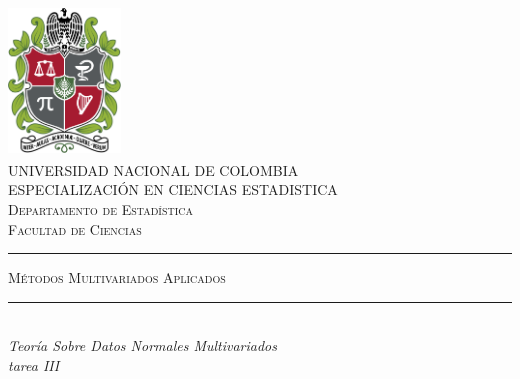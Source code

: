 



\begin{titlepage}

\newcommand{\HRule}{\rule{\linewidth}{0.5mm}} %

\center %


\begin{minipage}{13.5cm}
\center

\includegraphics[width=3cm,height=4cm]{logo}\\[0.5cm] %


\textsc{\Large UNIVERSIDAD NACIONAL DE COLOMBIA \\[1.0cm]
{\large ESPECIALIZACIÓN EN CIENCIAS ESTADISTICA\\[0.5cm]
Departamento de Estadística\\[0.2cm]
Facultad de Ciencias}}\\[2cm]



\rule[1.7mm]{1cm}{0.5mm}
\hfill
\textsc{\Large Métodos Multivariados Aplicados}
\hfill
\rule[1.7mm]{1cm}{0.5mm}
\\[0.2cm]

{\Large
\textit{Teoría Sobre Datos Normales Multivariados\\
tarea III}
}\\[0.2cm]


\end{minipage}
\end{titlepage}
